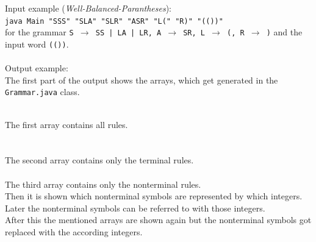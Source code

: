 \documentclass[a4paper, 11pt]{article}
\newcommand{\dq}{"}
\begin{document}
Input example (\textit{Well-Balanced-Parantheses}):\\
  \texttt{java Main \dq SSS\dq \ \dq SLA\dq \ \dq SLR\dq \ \dq ASR\dq \ \dq L(\dq \ \dq R)\dq\  \dq (())\dq}
\\ 
for the grammar \texttt{S $\rightarrow$ SS | LA | LR, A $\rightarrow$ SR, L $\rightarrow$ (, R $\rightarrow$ )} and the input word \texttt{(())}.
\\ \\
Output example: \\
The first part of the output shows the arrays, which get generated in the \texttt{Grammar.java} class.  \\ \\
\begin{minipage}{0.6\textwidth}
\vspace*{-2em}
The first array contains all rules. \\ \\ \\

The second array contains only the terminal rules. \\ \\

The third array contains only the nonterminal rules. \\

Then it is shown which nonterminal symbols are represented by which integers. Later the nonterminal symbols can be referred to with those integers. \\ 

After this the mentioned arrays are shown again but the nonterminal symbols got replaced with the according integers.


\end{minipage}
\end{document}
